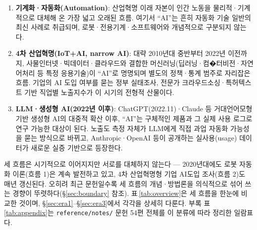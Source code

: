 \documentclass[11pt]{article}
\begin{document}
\begin{enumerate}[label=(\arabic*)]
  \item \textbf{기계화·자동화(Automation)}: 산업혁명 이래 자본이 인간 노동을 물리적·기계적으로 대체해 온 가장 넓고 오래된 흐름. 여기서 ``AI''는 흔히 자동화 기술 일반의 최신 사례로 취급되며, 로봇·전용기계·소프트웨어와 개념적으로 구분되지 않는다.
  \item \textbf{4차 산업혁명(IoT+AI, narrow AI)}: 대략 2010년대 중반부터 2022년 이전까지, 사물인터넷·빅데이터·클라우드와 결합한 머신러닝(딥러닝·컴�터비전·자연어처리 등 특정 응용기술)이 ``AI''로 명명되며 별도의 정책·통계 범주로 자리잡은 흐름. 기업의 AI 도입 여부를 묻는 정부 실태조사, 전문가 크라우드소싱·특허텍스트 기반 직업별 노출지수가 이 시기의 전형적 산물이다.
  \item \textbf{LLM·생성형 AI(2022년 이후)}: ChatGPT(2022.11)·Claude 등 거대언어모형 기반 생성형 AI의 대중적 확산 이후, ``AI''는 구체적인 제품과 그 실제 사용 로그로 연구 가능한 대상이 된다. 노출도 측정 자체가 LLM에게 직접 과업 자동화 가능성을 묻는 방식으로 바뀌고, Anthropic·OpenAI 등이 공개하는 실사용(usage) 데이터가 새로운 실증 기반으로 등장한다.
\end{enumerate}

세 흐름은 시기적으로 이어지지만 서로를 대체하지 않는다 — 2020년대에도 로봇 자동화 이론(흐름 1)은 계속 발전하고 있고, 4차 산업혁명형 기업 AI도입 조사(흐름 2)도 매년 갱신된다. 오히려 최근 문헌일수록 세 흐름의 개념·방법론을 의식적으로 섞어 쓰는 경향이 뚜렷하다(\S\ref{sec:boundary} 참조). 표\,\ref{tab:overview}은 세 흐름을 한눈에 비교한 것이며, \S\ref{sec:era1}--\S\ref{sec:era3}에서 각각을 상세히 다룬다. 부록 표\,\ref{tab:appendix}는 \texttt{reference/notes/} 문헌 54편 전체를 이 분류에 따라 정리한 일람표다.
\end{document}
